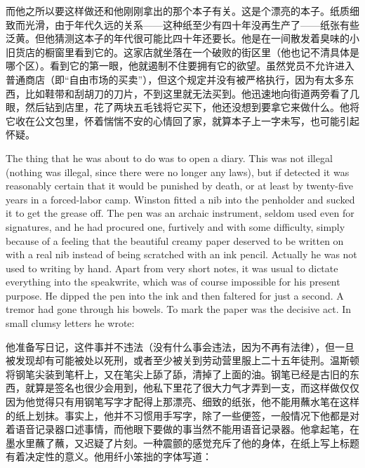 \begin{paracol}{2}
\switchcolumn

而他之所以要这样做还和他刚刚拿出的那个本子有关。这是个漂亮的本子。纸质细致而光滑，由于年代久远的关系——这种纸至少有四十年没再生产了——纸张有些泛黄。但他猜测这本子的年代很可能比四十年还要长。他是在一间散发着臭味的小旧货店的橱窗里看到它的。这家店就坐落在一个破败的街区里（他也记不清具体是哪个区）。看到它的第一眼，他就遏制不住要拥有它的欲望。虽然党员不允许进入普通商店（即``自由市场的买卖''），但这个规定并没有被严格执行，因为有太多东西，比如鞋带和刮胡刀的刀片，不到这里就无法买到。他迅速地向街道两旁看了几眼，然后钻到店里，花了两块五毛钱将它买下，他还没想到要拿它来做什么。他将它收在公文包里，怀着惴惴不安的心情回了家，就算本子上一字未写，也可能引起怀疑。

\switchcolumn*

The thing that he was about to do was to open a diary. This was not
illegal (nothing was illegal, since there were no longer any laws), but
if detected it was reasonably certain that it would be punished by
death, or at least by twenty-five years in a forced-labor camp. Winston
fitted a nib into the penholder and sucked it to get the grease off. The
pen was an archaic instrument, seldom used even for signatures, and he
had procured one, furtively and with some difficulty, simply because of
a feeling that the beautiful creamy paper deserved to be written on with
a real nib instead of being scratched with an ink pencil. Actually he
was not used to writing by hand. Apart from very short notes, it was
usual to dictate everything into the speakwrite, which was of course
impossible for his present purpose. He dipped the pen into the ink and
then faltered for just a second. A tremor had gone through his bowels.
To mark the paper was the decisive act. In small clumsy letters he
wrote:

\switchcolumn

他准备写日记，这件事并不违法（没有什么事会违法，因为不再有法律），但一旦被发现却有可能被处以死刑，或者至少被关到劳动营里服上二十五年徒刑。温斯顿将钢笔尖装到笔杆上，又在笔尖上舔了舔，清掉了上面的油。钢笔已经是古旧的东西，就算是签名也很少会用到，他私下里花了很大力气才弄到一支，而这样做仅仅因为他觉得只有用钢笔写字才配得上那漂亮、细致的纸张，他不能用蘸水笔在这样的纸上划抹。事实上，他并不习惯用手写字，除了一些便签，一般情况下他都是对着语音记录器口述事情，而他眼下要做的事当然不能用语音记录器。他拿起笔，在墨水里蘸了蘸，又迟疑了片刻。一种震颤的感觉充斥了他的身体，在纸上写上标题有着决定性的意义。他用纤小笨拙的字体写道：

\switchcolumn*



\end{paracol}
